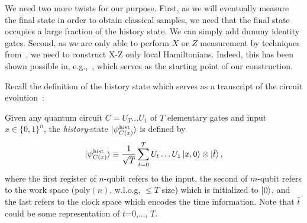 We need two more twists for our purpose.
First, as we will eventually measure the final state in order to obtain classical samples, we need that the final state occupies a large fraction of the history state. We can simply add dummy identity gates.
Second, as we are only able to perform $X$ or $Z$ measurement by techniques from~\cite{FOCS:Mahadev18a},
we need to construct X-Z only local Hamiltonians.
Indeed, this has been shown possible in, e.g.,~\cite{PhysRevA.78.012352}, which serves as the starting point of our construction.



Recall the definition of the history state which serves as a transcript of the circuit evolution~\cite{kitaev2002classical}:

\begin{dfn}
    \label{dfn:groundstate}    
    Given any quantum circuit $C=U_T\ldots U_1$ of $T$ elementary gates and input $x\in\{0,1\}^n$, the \emph{history}-state $\ket{\psi_{C(x)}^{\mathrm{hist}}}$ is defined by
    \begin{equation}
        \ket{\psi_{C(x)}^{\mathrm{hist}}} \equiv \frac{1}{\sqrt{T}}\sum_{t=0}^TU_t\ldots U_1\ket{x,0}\otimes\ket{\hat{t}},
    \end{equation}
    where the first register of $n$-qubit refers to the input, the second of $m$-qubit refers to the work space ($\mathrm{poly}(n)$, w.l.o.g, $\leq T$ size) which is initialized to $\ket{0}$, and the last refers to the clock space which encodes the time information. Note that $\hat{t}$ could be some representation of $t$=0,..., $T$.
\end{dfn}

